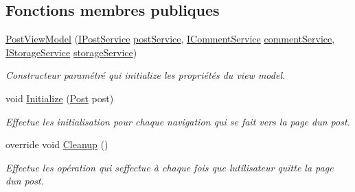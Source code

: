 \subsection*{Fonctions membres publiques}
\begin{DoxyCompactItemize}
\item 
\hyperlink{class_boxes_1_1_view_models_1_1_post_view_model_add75fd3783e75abcdd4dff1e42863c19}{Post\+View\+Model} (\hyperlink{interface_boxes_1_1_services_1_1_post_1_1_i_post_service}{I\+Post\+Service} \hyperlink{class_boxes_1_1_view_models_1_1_post_view_model_a429fe7a882ebbfe77a34a61455d57bae}{post\+Service}, \hyperlink{interface_boxes_1_1_services_1_1_comment_1_1_i_comment_service}{I\+Comment\+Service} \hyperlink{class_boxes_1_1_view_models_1_1_post_view_model_acc5fcad092fad7381a4c3af8395a4603}{comment\+Service}, \hyperlink{interface_boxes_1_1_services_1_1_storage_1_1_i_storage_service}{I\+Storage\+Service} \hyperlink{class_boxes_1_1_view_models_1_1_post_view_model_a1e927d657f4db7956ceaa5ff9d31f2ff}{storage\+Service})
\begin{DoxyCompactList}\small\item\em Constructeur paramétré qui initialize les propriétés du view model. \end{DoxyCompactList}\item 
void \hyperlink{class_boxes_1_1_view_models_1_1_post_view_model_a78674d635b7d60b434063e28c999188c}{Initialize} (\hyperlink{class_boxes_1_1_models_1_1_post}{Post} post)
\begin{DoxyCompactList}\small\item\em Effectue les initialisation pour chaque navigation qui se fait vers la page d\textquotesingle{}un post. \end{DoxyCompactList}\item 
override void \hyperlink{class_boxes_1_1_view_models_1_1_post_view_model_a76a15d6ed8c055d72c786b117081ba18}{Cleanup} ()
\begin{DoxyCompactList}\small\item\em Effectue les opération qui s\textquotesingle{}effectue à chaque fois que l\textquotesingle{}utilisateur quitte la page d\textquotesingle{}un post. \end{DoxyCompactList}\end{DoxyCompactItemize}
